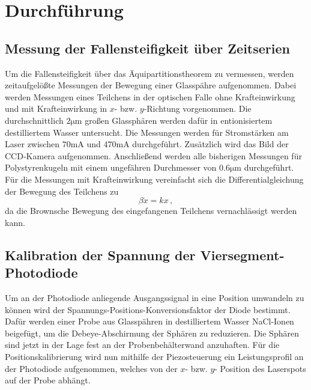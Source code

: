 \section{Durchführung}
\subsection{Messung der Fallensteifigkeit über Zeitserien}
Um die Fallensteifigkeit über das Äquipartitionstheorem zu vermessen, werden zeitaufgelößte Messungen der Bewegung einer Glasspähre aufgenommen. Dabei werden Messungen eines Teilchens in der optischen Falle ohne Krafteinwirkung und mit Krafteinwirkung in $x$- bzw. $y$-Richtung vorgenommen. Die durchschnittlich $2 \si{\micro\meter}$ großen Glassphären werden dafür in entionisiertem destilliertem Wasser untersucht. Die Messungen werden für Stromstärken am Laser zwischen $70\si{\milli\ampere}$ und $470\si{\milli\ampere}$ durchgeführt. Zusätzlich wird das Bild der CCD-Kamera aufgenommen. Anschließend werden alle bisherigen Messungen für Polystyrenkugeln mit einem ungefähren Durchmesser von $0.6\si{\micro\meter}$ durchgeführt.\\
Für die Messungen mit Krafteinwirkung vereinfacht sich die Differentialgleichung der Bewegung des Teilchens zu
\begin{equation}
  \beta \dot x = kx \, ,
\end{equation}
da die Brownsche Bewegung des eingefangenen Teilchens vernachlässigt werden kann.

\subsection{Kalibration der Spannung der Viersegment-Photodiode}
Um an der Photodiode anliegende Ausgangssignal in eine Position umwandeln zu können wird der Spannungs-Positions-Konversionsfaktor der Diode bestimmt. Dafür werden einer Probe aus Glasspähren in destilliertem Wasser NaCl-Ionen beigefügt, um die Debeye-Abschirmung der Sphären zu reduzieren. Die Sphären sind jetzt in der Lage fest an der Probenbehälterwand anzuhaften. Für die Positionskalibrierung wird nun mithilfe der Piezosteuerung ein Leistungsprofil an der Photodiode aufgenommen, welches von der $x$- bzw. $y$- Position des Laserspots auf der Probe abhängt.

